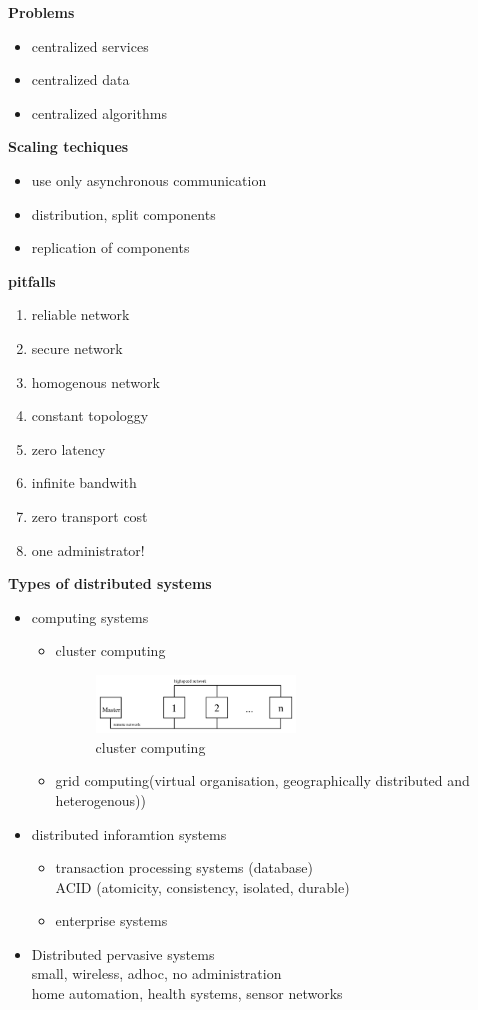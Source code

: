 \documentclass[ngerman,a4paper]{report}
\begin{document}
\textbf{Problems}

\begin{itemize}
\item centralized services
\item centralized data
\item centralized algorithms
\end{itemize}

\textbf{Scaling techiques}

\begin{itemize}
\item use only asynchronous communication
\item distribution, split components
\item replication of components
\end{itemize}

\textbf{pitfalls}

\begin{enumerate}
\item reliable network
\item secure network
\item homogenous network
\item constant topologgy
\item zero latency
\item infinite bandwith
\item zero transport cost
\item one administrator!
\end{enumerate}

\textbf{Types of distributed systems}
\begin{itemize}
\item computing systems
\begin{itemize}
\item cluster computing
\begin{figure}[h]
	\centering
	\includegraphics[width=200px]{gfx/cluster_computing.png}
	\caption{cluster computing}
	\label{img:cluster_comp}
\end{figure}
\item grid computing(virtual organisation, geographically distributed and heterogenous))
\end{itemize}
\item distributed inforamtion systems
\begin{itemize}
\item transaction processing systems (database) \\
ACID (atomicity, consistency, isolated, durable)
\item enterprise systems
\end{itemize}
\item Distributed pervasive systems\\
small, wireless, adhoc, no administration\\
home automation, health systems, sensor networks
\end{itemize}
\end{document}
